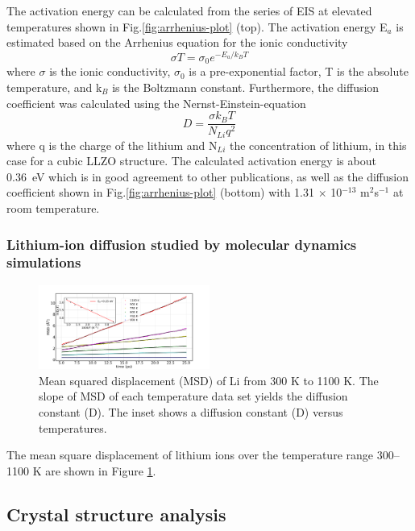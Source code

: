 \documentclass[twoside,twocolumn,9pt]{article}
\begin{document}
The activation energy can be calculated from the series of EIS at elevated temperatures shown in Fig.\ref{fig:arrhenius-plot} (top).
The activation energy E$_a$ is estimated based on the Arrhenius equation for the ionic conductivity
\begin{equation}
\sigma T = \sigma_0 e^{-E_a/k_B T}
\end{equation}
where $\sigma$ is the ionic conductivity, $\sigma_0$ is a pre-exponential factor, T is the absolute temperature, and k$_B$ is the Boltzmann constant.
Furthermore, the diffusion coefficient was calculated using the Nernst-Einstein-equation
\begin{equation}
D=\frac{\sigma k_B T}{N_{Li} q^2}
\end{equation}
where q is the charge of the lithium and N$_{Li}$ the concentration of lithium, in this case for a cubic LLZO structure.
The calculated activation energy is about 0.36~eV which is in good agreement to other publications,
as well as the diffusion coefficient shown in Fig.\ref{fig:arrhenius-plot} (bottom) with 1.31 $\times$ 10$^{-13}$ m$^2$s$^{-1}$ at room temperature.





\subsubsection{Lithium-ion diffusion studied by molecular dynamics simulations}

\begin{figure}[t]
\centering
\includegraphics[width=0.5\textwidth]{Pics/MSD.pdf}
\caption{Mean squared displacement (MSD) of Li from 300 K to 1100 K.
The slope of MSD of each temperature data set yields the diffusion constant (D).
The inset shows a diffusion constant (D) versus temperatures.}
\label{fig:msd}
\end{figure}

The mean square displacement of lithium ions over the temperature range 300--1100 K are shown in Figure \ref{fig:msd}.

\subsection{Crystal structure analysis}
\end{document}
